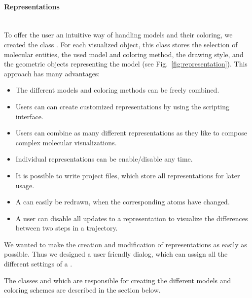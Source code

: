 \label{representation}
\paragraph{Representations}
\hspace*{\fill}\\
\noindent
To offer the user an intuitive way of handling models and their coloring, we 
created the class . For each visualized object, this 
class stores the selection of molecular entities, the used model and coloring 
method, the drawing style, and the geometric objects representing the model 
(see Fig.~\ref{fig:representation}). This approach has many advantages:
\begin{itemize}
  \item The different models and coloring methods can be freely combined.
  \item Users can can create customized representations \eg by using the 
         scripting interface.
  \item Users can combine as many different representations as they like to
        compose complex molecular visualizations.
  \item Individual representations can be enable/disable any time.
  \item It is possible to write project files, which store all representations
        for later usage.
  \item A  can easily be redrawn, when the corresponding
        atoms have changed.
  \item A user can disable all updates to a representation \eg to visualize the
        differences between two steps in a trajectory.
\end{itemize}

We wanted to make the creation and modification of representations as easily 
as possible. Thus we designed a user friendly dialog, which can assign all the 
different settings of a .

The classes  and  which are 
responsible for creating the different models and coloring schemes are 
described in the section below.

